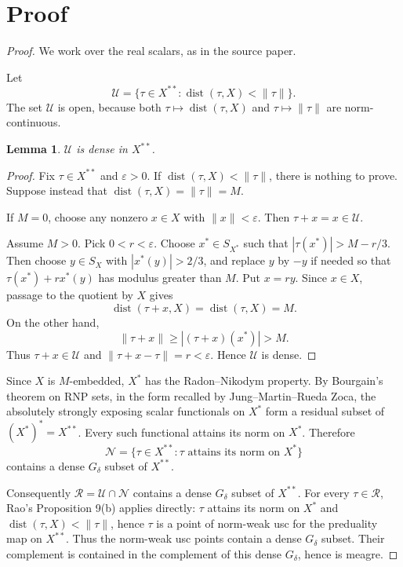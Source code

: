 \documentclass[11pt]{article}
\newtheorem{lemma}{Lemma}
\newcommand{\dist}{\operatorname{dist}}
\begin{document}
\section*{Proof}

\begin{proof}
We work over the real scalars, as in the source paper.

Let
\[
  \mathcal U=\{\tau\in X^{**}:\dist(\tau,X)<\|\tau\|\}.
\]
The set \(\mathcal U\) is open, because both \(\tau\mapsto \dist(\tau,X)\) and
\(\tau\mapsto \|\tau\|\) are norm-continuous.

\begin{lemma}
\(\mathcal U\) is dense in \(X^{**}\).
\end{lemma}

\begin{proof}
Fix \(\tau\in X^{**}\) and \(\varepsilon>0\). If
\(\dist(\tau,X)<\|\tau\|\), there is nothing to prove. Suppose instead that
\(\dist(\tau,X)=\|\tau\|=M\).

If \(M=0\), choose any nonzero \(x\in X\) with \(\|x\|<\varepsilon\). Then
\(\tau+x=x\in\mathcal U\).

Assume \(M>0\). Pick \(0<r<\varepsilon\). Choose \(x^*\in S_{X^*}\) such that
\(|\tau(x^*)|>M-r/3\). Then choose \(y\in S_X\) with
\(|x^*(y)|>2/3\), and replace \(y\) by \(-y\) if needed so that
\(\tau(x^*)+r x^*(y)\) has modulus greater than \(M\). Put \(x=ry\). Since
\(x\in X\), passage to the quotient by \(X\) gives
\[
  \dist(\tau+x,X)=\dist(\tau,X)=M.
\]
On the other hand,
\[
  \|\tau+x\|\ge |(\tau+x)(x^*)|>M.
\]
Thus \(\tau+x\in\mathcal U\) and \(\|\tau+x-\tau\|=r<\varepsilon\). Hence
\(\mathcal U\) is dense.
\end{proof}

Since \(X\) is \(M\)-embedded, \(X^*\) has the Radon--Nikodym property. By
Bourgain's theorem on RNP sets, in the form recalled by Jung--Martin--Rueda
Zoca, the absolutely strongly exposing scalar functionals on \(X^*\) form a
residual subset of \((X^*)^*=X^{**}\). Every such functional attains its norm
on \(X^*\). Therefore
\[
  \mathcal N=\{\tau\in X^{**}:\tau\text{ attains its norm on }X^*\}
\]
contains a dense \(G_\delta\) subset of \(X^{**}\).

Consequently \(\mathcal R=\mathcal U\cap\mathcal N\) contains a dense
\(G_\delta\) subset of \(X^{**}\). For every \(\tau\in\mathcal R\), Rao's
Proposition 9(b) applies directly: \(\tau\) attains its norm on \(X^*\) and
\(\dist(\tau,X)<\|\tau\|\), hence \(\tau\) is a point of norm-weak usc for the
preduality map on \(X^{**}\). Thus the norm-weak usc points contain a dense
\(G_\delta\) subset. Their complement is contained in the complement of this
dense \(G_\delta\), hence is meagre.
\end{proof}
\end{document}

